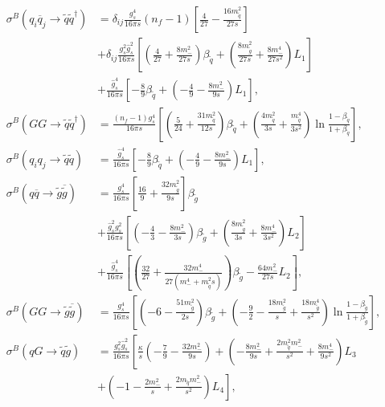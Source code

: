 \begin{align}
\sigma^B(q_i \overline{q}_j \to \tilde{q}\tilde{q}^\dagger) &= \delta_{ij}  \frac{g_s^4}{16\pi s} (n_f-1) \left[ \frac{4}{27} - \frac{16 m_{\tilde{q}}^2}{27s} \right]\nonumber\\
&+ \delta_{ij} \frac{g_s^2\hat{g}_s^2}{16\pi s}  \left[ \left( \frac{4}{27} + \frac{8 m_-^2}{27 s} \right)\beta_{\tilde{q}}  + \left( \frac{8m_{\tilde{g}}^2}{27s} + \frac{8m_-^4}{27s^2} \right)L_1 \right]\nonumber\\
& + \frac{\hat{g}_s^4}{16\pi s} \left[ -\frac{8}{9}\beta_{\tilde{q}} + \left( -\frac{4}{9} - \frac{8m_-^2}{9s} \right)L_1 \right],\\
\sigma^B(GG \to \tilde{q}\tilde{q}^\dagger) &= \frac{(n_f-1) g_s^4}{16\pi s} \left[ \left(\frac{5}{24} + \frac{31 m_{\tilde{q}}^2}{12s}\right)\beta_{\tilde{q}} + \left( \frac{4m_{\tilde{q}}^2}{3s} + \frac{m_{\tilde{q}}^4}{3s^2} \right) \ln \frac{1-\beta_{\tilde{q}}}{1+\beta_{\tilde{q}}} \right],\\
\sigma^B(q_i q_j \to \tilde{q}\tilde{q}) &= \frac{\hat{g}_s^4}{16\pi s} \left[ -\frac{8}{9}\beta_{\tilde{q}} +  \left( -\frac{4}{9} - \frac{8m_-^2}{9s} \right)L_1 \right],\\
\sigma^B(q \overline{q} \to \tilde{g}\overline{\tilde{g}}) &= \frac{g_s^4}{16\pi s} \left[ \frac{16}{9} + \frac{32m_{\tilde{g}}^2}{9s} \right] \beta_{\tilde{g}}\nonumber\\
& + \frac{\hat{g}_s^2 g_s^2}{16\pi s}  \left[ \left( -\frac{4}{3}-\frac{8m_-^2}{3s} \right)\beta_{\tilde{g}} + \left( \frac{8 m_{\tilde{g}}^2}{3s} + \frac{8m_-^4}{3s^2} \right) L_2 \right]\nonumber\\
& + \frac{\hat{g}_s^4}{16\pi s} \left[ \left( \frac{32}{27} + \frac{32 m_-^4}{27(m_-^4 + m_{\tilde{q}}^2s)} \right)\beta_{\tilde{g}} - \frac{64m_-^2}{27s}L_2 \right],\label{eq:qqbar_to_sgsgbar}\\
\sigma^B(GG \to \tilde{g}\overline{\tilde{g}}) &= \frac{g_s^4}{16\pi s} \left[ \left( -6 - \frac{51 m_{\tilde{g}}^2}{2s} \right)\beta_{\tilde{g}} + \left( -\frac{9}{2} - \frac{18 m_{\tilde{g}}^2}{s} + \frac{18 m_{\tilde{g}}^4}{s^2} \right)\ln \frac{1-\beta_{\tilde{g}}}{1+\beta_{\tilde{g}}} \right],\\
\sigma^B(q G \to \tilde{q} \tilde{g}) &= \frac{g_s^2\hat{g}_s^2}{16\pi s} \left[ \frac{\kappa}{s}\left( -\frac{7}{9} - \frac{32 m_{-}^2}{9s} \right) + \left( -\frac{8m_-^2}{9s} + \frac{2m_{\tilde{q}}^2m_-^2}{s^2} + \frac{8 m_-^4}{9s^2} \right)L_3\right.\nonumber\\
&+\left. \left( -1-\frac{2m_-^2}{s} + \frac{2m_{\tilde{q}}m_-^2}{s^2} \right)L_4 \right],
\end{align}
